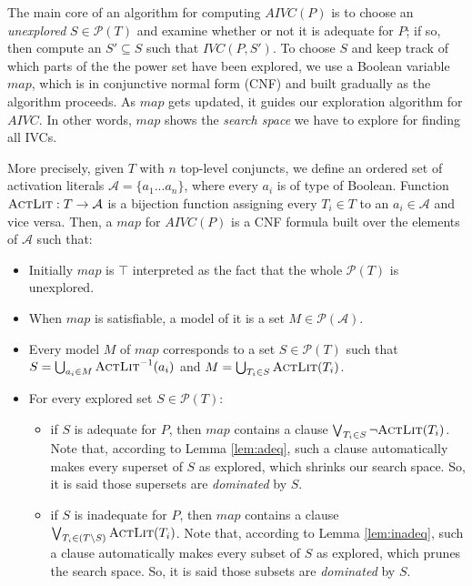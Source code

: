 The main core of an algorithm for computing $AIVC(P)$ is to choose an \emph{unexplored} $S \in \mathcal{P}(T)$ and examine whether or not it is adequate for $P$; if so, then compute an $S' \subseteq S$ such that $IVC(P, S')$.
To choose $S$ and keep track of which parts of the the power set
have been explored, we use a Boolean variable $map$, which is
in conjunctive normal form (CNF) and built gradually as the algorithm proceeds.
As $map$ gets updated, it guides our exploration algorithm for $AIVC$.
In other words, $map$ shows the \emph{search space} we have to explore for finding all IVCs.

More precisely, given $T$ with $n$ top-level conjuncts,
we define an ordered
set of activation literals $\mathcal{A} = \{a_1...a_n\}$, where every $a_i$ is of type of Boolean. Function $\textsc{ActLit} : T \rightarrow \mathcal{A}$
is a bijection function assigning every $T_i \in T$ to an $a_i \in \mathcal{A}$ and vice versa.
Then, a $map$ for $AIVC(P)$ is a CNF formula built over the elements of $\mathcal{A}$ such that:
\begin{itemize}
  \item Initially $map$ is $\top$ interpreted as the fact that the whole $\mathcal{P}(T)$ is unexplored.
  \item When $map$ is satisfiable, a model of it is a set
  $M \in \mathcal{P}(\mathcal{A})$.
  \item Every model $M$ of $map$ corresponds to a set $S \in \mathcal{P}(T)$ such that
$S = \bigcup_{a_i \in M} \textsc{ActLit} ^{-1} (a_i)$ and $M = \bigcup_{T_i \in S} \textsc{ActLit}(T_i)$.
  \item For every explored set $S \in \mathcal{P}(T)$:
  \begin{itemize}
    \item if $S$ is adequate for $P$, then $map$ contains a clause $\bigvee_{T_{i}\in S} \neg {\textsc{ActLit}(T_i)}$. Note that, according to Lemma \ref{lem:adeq}, such a clause automatically makes every superset of $S$ as explored, which shrinks our search space. So, it is said those supersets are \emph{dominated} by $S$.
    \item if $S$ is inadequate for $P$, then $map$ contains a clause $\bigvee_{T_{i}\in (T \setminus S)} \textsc{ActLit} (T_i)$. Note that, according to Lemma \ref{lem:inadeq}, such a clause automatically makes every subset of $S$ as explored, which prunes the search space. So, it is said those subsets are \emph{dominated} by $S$.
  \end{itemize}
\end{itemize}


